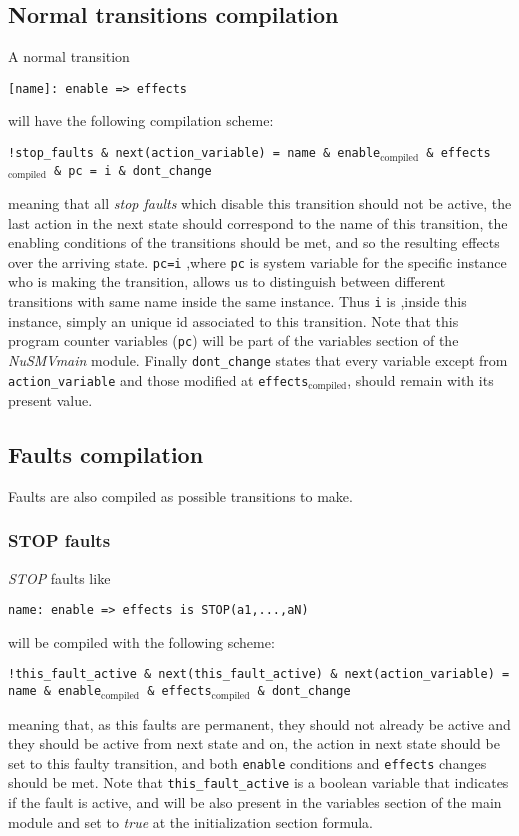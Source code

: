 \documentclass[12pt]{article}
\newcommand{\nusmv}{\mbox{\textit{NuSMV}}}
\newcommand{\textusc}[1]{$_{\text{#1}}$} %
\begin{document}
\subsection{Normal transitions compilation}
A normal transition
\begin{center}
\texttt{[name]: enable => effects}
\end{center}
will have the following compilation scheme:
\begin{center}
\texttt{!stop\_faults \& next(action\_variable) = name \& enable\textusc{compiled} \& effects\textusc{compiled} \& pc = i \& dont\_change}
\end{center}
meaning that all \textit{stop faults} which disable this transition should not be active, the last action in the next state should correspond to the name of this transition, the enabling conditions of the transitions should be met, and so the resulting effects over the arriving state. \texttt{pc=i} ,where \texttt{pc} is system variable for the specific instance who is making the transition, allows us to distinguish between different transitions with same name inside the same instance. Thus \texttt{i} is ,inside this instance, simply an unique id associated to this transition. Note that this program counter variables (\texttt{pc}) will be part of the variables section of the \nusmv \textit{main} module. Finally \texttt{dont\_change} states that every variable except from \texttt{action\_variable} and those modified at \texttt{effects\textusc{compiled}}, should remain with its present value. 
\subsection{Faults compilation}
Faults are also compiled as possible transitions to make.
\subsubsection*{STOP faults}
\textit{STOP} faults like
\begin{center}
\texttt{name: enable => effects is STOP(a1,...,aN)}
\end{center}
will be compiled with the following scheme:
\begin{center}
\texttt{!this\_fault\_active \& next(this\_fault\_active) \& next(action\_variable) = name \& enable\textusc{compiled} \& effects\textusc{compiled} \& dont\_change }
\end{center}
meaning that, as this faults are permanent, they should not already be active and they should be active from next state and on, the action in next state should be set to this faulty transition, and both \texttt{enable} conditions and \texttt{effects} changes should be met. Note that \texttt{this\_fault\_active} is a boolean variable that indicates if the fault is active, and will be also present in the variables section of the main module and set to \textit{true} at the initialization section formula.
\end{document}

